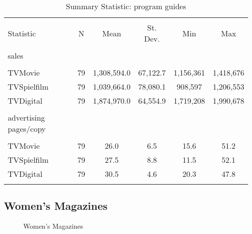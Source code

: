 \documentclass[12pt,a4paper]{scrreprt}
\begin{document}
\begin{appendices}
\begin{table}[!htbp] \centering 
  \caption{Summary Statistic: program guides} 
  \label{} 
\begin{tabular}{@{\extracolsep{5pt}}lccccc} 
\\[-1.8ex]\hline 
\hline \\[-1.8ex] 
Statistic & \multicolumn{1}{c}{N} & \multicolumn{1}{c}{Mean} & \multicolumn{1}{c}{St. Dev.} & \multicolumn{1}{c}{Min} & \multicolumn{1}{c}{Max} \\ 
\hline \\[-1.8ex] 
sales \\
\hline \\[-1.8ex]
TVMovie & 79 & 1,308,594.0 & 67,122.7 & 1,156,361 & 1,418,676 \\ 
TVSpielfilm & 79 & 1,039,664.0 & 78,080.1 & 908,597 & 1,206,553 \\ 
TVDigital & 79 & 1,874,970.0 & 64,554.9 & 1,719,208 & 1,990,678 \\ 
\hline \\[-1.8ex] 
advertising pages/copy \\
\hline \\[-1.8ex]
TVMovie & 79 & 26.0 & 6.5 & 15.6 & 51.2 \\ 
TVSpielfilm & 79 & 27.5 & 8.8 & 11.5 & 52.1 \\ 
TVDigital & 79 & 30.5 & 4.6 & 20.3 & 47.8 \\ 
\hline \\[-1.8ex] 
\end{tabular} 
\end{table}


\subsection{Women's Magazines}\label{appendix_sum_frauen}

\begin{figure}[H]
\caption{Women's Magazines}
\label{fig_frauen}
\begin{minipage}
	\centering
	
\end{minipage}
\hfil
\begin{minipage}
	\centering
	
\end{minipage}
\end{figure}



\end{appendices}
\end{document}
